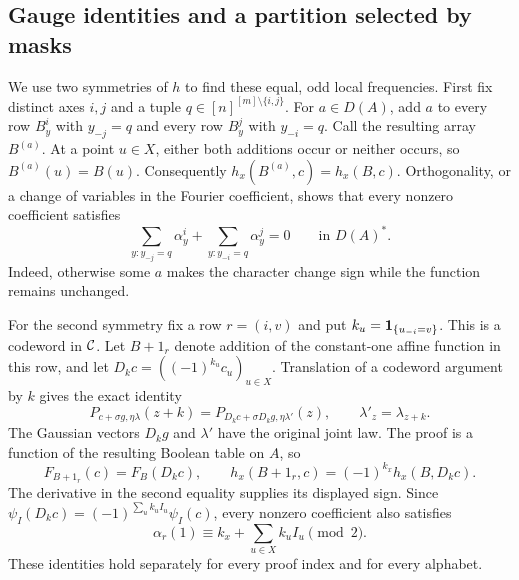 \subsection{Gauge identities and a partition selected by masks}

We use two symmetries of $h$ to find these equal, odd local frequencies.
First fix distinct axes $i,j$ and a tuple
$q\in[n]^{[m]\setminus\{i,j\}}$. For $a\in D(A)$, add $a$ to every row
$B^i_y$ with $y_{-j}=q$ and every row $B^j_y$ with $y_{-i}=q$.
Call the resulting array $B^{(a)}$. At a point $u\in X$, either both
additions occur or neither occurs, so $B^{(a)}(u)=B(u)$. Consequently
$h_x(B^{(a)},c)=h_x(B,c)$. Orthogonality, or a change of variables in the
Fourier coefficient, shows that every nonzero coefficient satisfies
\begin{equation}\label{eq:cylinder-gauge}
 \sum_{y:y_{-j}=q}\alpha^i_y
 +\sum_{y:y_{-i}=q}\alpha^j_y=0
 \qquad\text{in }D(A)^*.
\end{equation}
Indeed, otherwise some $a$ makes the character change sign while the
function remains unchanged.

For the second symmetry fix a row $r=(i,v)$ and put
$k_u=\mathbf 1_{\{u_{-i}=v\}}$. This is a codeword in $\mathcal C$. Let $B+1_r$
denote addition of the constant-one affine function in this row, and let
$D_kc=((-1)^{k_u}c_u)_{u\in X}$. Translation of a codeword argument by
$k$ gives the exact identity
\[
 P_{c+\sigma g,\eta\lambda}(z+k)
 =P_{D_kc+\sigma D_kg,\eta\lambda'}(z),
 \qquad \lambda'_z=\lambda_{z+k}.
\]
The Gaussian vectors $D_kg$ and $\lambda'$ have the original joint law.
The proof is a function of the resulting Boolean table on $A$, so
\[
 F_{B+1_r}(c)=F_B(D_kc),\qquad
 h_x(B+1_r,c)=(-1)^{k_x}h_x(B,D_kc).
\]
The derivative in the second equality supplies its displayed sign.
Since $\psi_I(D_kc)=(-1)^{\sum_u k_u I_u}\psi_I(c)$, every nonzero
coefficient also satisfies
\begin{equation}\label{eq:row-gauge}
 \alpha_r(1)\equiv k_x+\sum_{u\in X}k_uI_u\pmod2.
\end{equation}
These identities hold separately for every proof index and for every
alphabet.

